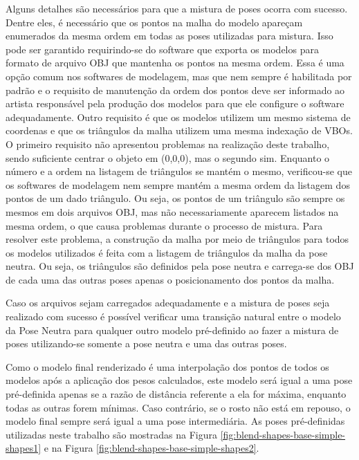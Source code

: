 Alguns detalhes são necessários para que a mistura de poses ocorra com sucesso. Dentre eles, é necessário que os pontos na malha do modelo apareçam enumerados da mesma ordem em todas as poses utilizadas para mistura. Isso pode ser garantido requirindo-se do software que exporta os modelos para formato de arquivo OBJ que mantenha os pontos na mesma ordem. Essa é uma opção comum nos softwares de modelagem, mas que nem sempre é habilitada por padrão e o requisito de manutenção da ordem dos pontos deve ser informado ao artista responsável pela produção dos modelos para que ele configure o software adequadamente. Outro requisito é que os modelos utilizem um mesmo sistema de coordenas e que os triângulos da malha utilizem uma mesma indexação de VBOs. O primeiro requisito não apresentou problemas na realização deste trabalho, sendo suficiente centrar o objeto em (0,0,0), mas o segundo sim. Enquanto o número e a ordem na listagem de triângulos se mantém o mesmo, verificou-se que os softwares de modelagem nem sempre mantém a mesma ordem da listagem dos pontos de um dado triângulo. Ou seja, os pontos de um triângulo são sempre os mesmos em dois arquivos OBJ, mas não necessariamente aparecem listados na mesma ordem, o que causa problemas durante o processo de mistura. Para resolver este problema, a construção da malha por meio de triângulos para todos os modelos utilizados é feita com a listagem de triângulos da malha da pose neutra. Ou seja, os triângulos são definidos pela pose neutra e carrega-se dos OBJ de cada uma das outras poses apenas o posicionamento dos pontos da malha.

Caso os arquivos sejam carregados adequadamente e a mistura de poses seja realizado com sucesso é possível verificar uma transição natural entre o modelo da Pose Neutra para qualquer outro modelo pré-definido ao fazer a mistura de poses utilizando-se somente a pose neutra e uma das outras poses.

Como o modelo final renderizado é uma interpolação dos pontos de todos os modelos após a aplicação dos pesos calculados, este modelo será igual a uma pose pré-definida apenas se a razão de distância referente a ela for máxima, enquanto todas as outras forem mínimas. Caso contrário, se o rosto não está em repouso, o modelo final sempre será igual a uma pose intermediária. As poses pré-definidas utilizadas neste trabalho são mostradas na Figura \ref{fig:blend-shapes-base-simple-shapes1} e na Figura \ref{fig:blend-shapes-base-simple-shapes2}.



